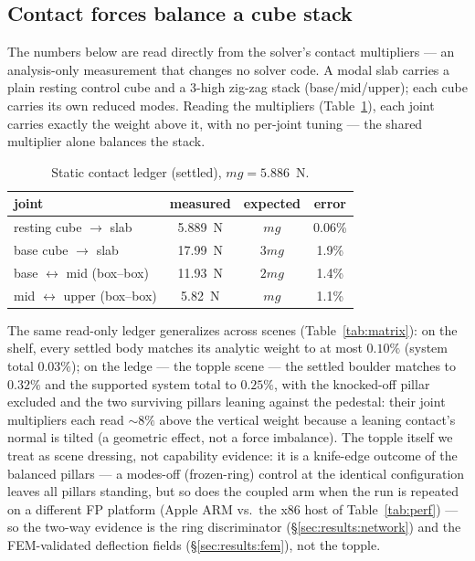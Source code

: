 \subsection{Contact forces balance a cube stack}
\label{sec:results:ledger}
The numbers below are read directly from the solver's contact multipliers ---
an analysis-only measurement that changes no solver code. A modal slab carries
a plain resting control cube and a 3-high zig-zag
stack (base/mid/upper); each cube carries its own reduced modes. Reading the
multipliers (Table~\ref{tab:ledger}), each joint carries exactly the weight above it,
with no per-joint tuning --- the shared multiplier alone balances the stack.

\begin{table}[t]\centering\footnotesize
\caption{Static contact ledger (settled), $m g = 5.886$~N.}
\label{tab:ledger}
\begin{tabular}{lccc}
\toprule
joint & measured & expected & error \\
\midrule
resting cube $\to$ slab                & 5.889~N & $mg$  & 0.06\% \\
base cube $\to$ slab                   & 17.99~N & $3mg$ & 1.9\%  \\
base $\leftrightarrow$ mid (box--box)  & 11.93~N & $2mg$ & 1.4\%  \\
mid $\leftrightarrow$ upper (box--box) & 5.82~N  & $mg$  & 1.1\%  \\
\bottomrule
\end{tabular}
\end{table}

The same read-only ledger generalizes across scenes (Table~\ref{tab:matrix}):
on the shelf, every settled body matches its analytic weight to at most
$0.10\%$ (system total $0.03\%$); on the ledge --- the topple scene --- the
settled boulder matches to $0.32\%$ and the supported system total to
$0.25\%$, with the knocked-off pillar excluded and the two surviving pillars
leaning against the pedestal: their joint multipliers each read ${\sim}8\%$
above the vertical weight because a leaning contact's normal is tilted (a
geometric effect, not a force imbalance). The topple itself we treat as scene
dressing, not capability evidence: it is a knife-edge outcome of the balanced
pillars --- a modes-off (frozen-ring) control at the identical configuration
leaves all pillars standing, but so does the coupled arm when the run is
repeated on a different FP platform (Apple ARM vs.\ the x86 host of
Table~\ref{tab:perf}) --- so the two-way evidence is the ring discriminator
(\S\ref{sec:results:network}) and the FEM-validated deflection fields
(\S\ref{sec:results:fem}), not the topple.

